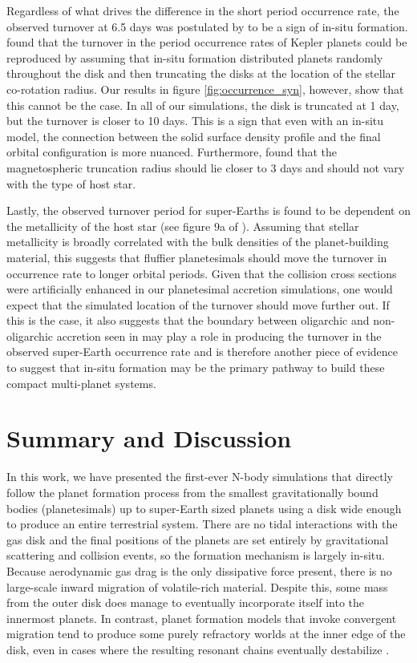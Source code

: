 Regardless of what drives the difference in the short period occurrence rate, the observed turnover at 6.5 days was postulated by \cite{petigura18} to be a sign of in-situ formation. \cite{lee17} found that the turnover in the period occurrence rates of Kepler planets could be reproduced by assuming that in-situ formation distributed planets randomly throughout the disk and then truncating the disks at the location of the stellar co-rotation radius. Our results in figure \ref{fig:occurrence_syn}, however, show that this cannot be the case. In all of our simulations, the disk is truncated at 1 day, but the turnover is closer to 10 days. This is a sign that even with an in-situ model, the connection between the solid surface density profile and the final orbital configuration is more nuanced. Furthermore, \cite{batygin23} found that the magnetospheric truncation radius should lie closer to 3 days and should not vary with the type of host star.

Lastly, the observed turnover period for super-Earths is found to be dependent on the metallicity of the host star (see figure 9a of \cite{petigura18}). Assuming that stellar metallicity is broadly correlated with the bulk densities of the planet-building material, this suggests that fluffier planetesimals should move the turnover in occurrence rate to longer orbital periods. Given that the collision cross sections were artificially enhanced in our planetesimal accretion simulations, one would expect that the simulated location of the turnover should move further out. If this is the case, it also suggests that the boundary between oligarchic and non-oligarchic accretion seen in \cite{wallace23} may play a role in producing the turnover in the observed super-Earth occurrence rate and is therefore another piece of evidence to suggest that in-situ formation may be the primary pathway to build these compact multi-planet systems.

\section{Summary and Discussion} \label{sec:discuss}

In this work, we have presented the first-ever N-body simulations that directly follow the planet formation process from the smallest gravitationally bound bodies (planetesimals) up to super-Earth sized planets using a disk wide enough to produce an entire terrestrial system. There are no tidal interactions with the gas disk and the final positions of the planets are set entirely by gravitational scattering and collision events, so the formation mechanism is largely in-situ. Because aerodynamic gas drag is the only dissipative force present, there is no large-scale inward migration of volatile-rich material. Despite this, some mass from the outer disk does manage to eventually incorporate itself into the innermost planets. In contrast, planet formation models that invoke convergent migration tend to produce some purely refractory worlds at the inner edge of the disk, even in cases where the resulting resonant chains eventually destabilize \cite{raymond18}. 

